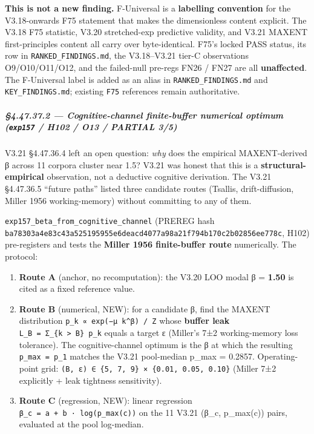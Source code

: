 \documentclass[
]{article}
\providecommand{\tightlist}{%
  \setlength{\itemsep}{0pt}\setlength{\parskip}{0pt}}
\begin{document}
\textbf{This is not a new finding.} F-Universal is a \textbf{labelling
convention} for the V3.18-onwards F75 statement that makes the
dimensionless content explicit. The V3.18 F75 statistic, V3.20
stretched-exp predictive validity, and V3.21 MAXENT first-principles
content all carry over byte-identical. F75's locked PASS status, its row
in \texttt{RANKED\_FINDINGS.md}, the V3.18--V3.21 tier-C observations
O9/O10/O11/O12, and the failed-null pre-regs FN26 / FN27 are all
\textbf{unaffected}. The F-Universal label is added as an alias in
\texttt{RANKED\_FINDINGS.md} and \texttt{KEY\_FINDINGS.md}; existing
\texttt{F75} references remain authoritative.

\subparagraph{\texorpdfstring{§4.47.37.2 --- Cognitive-channel
finite-buffer numerical optimum (\texttt{exp157} / H102 / O13 / PARTIAL
3/5)}{§4.47.37.2 --- Cognitive-channel finite-buffer numerical optimum (exp157 / H102 / O13 / PARTIAL 3/5)}}\label{cognitive-channel-finite-buffer-numerical-optimum-exp157-h102-o13-partial-35}

V3.21 §4.47.36.4 left an open question: \emph{why} does the empirical
MAXENT-derived β across 11 corpora cluster near 1.5? V3.21 was honest
that this is a \textbf{structural-empirical} observation, not a
deductive cognitive derivation. The V3.21 §4.47.36.5 ``future paths''
listed three candidate routes (Tsallis, drift-diffusion, Miller 1956
working-memory) without committing to any of them.

\texttt{exp157\_beta\_from\_cognitive\_channel} (PREREG hash
\texttt{ba78303a4e83c43a525195955e6deacd4077a98a21f794b170c2b02856ee778c},
H102) pre-registers and tests the \textbf{Miller 1956 finite-buffer
route} numerically. The protocol:

\begin{enumerate}
\def\labelenumi{\arabic{enumi}.}
\tightlist
\item
  \textbf{Route A} (anchor, no recomputation): the V3.20 LOO modal β =
  \textbf{1.50} is cited as a fixed reference value.
\item
  \textbf{Route B} (numerical, NEW): for a candidate β, find the MAXENT
  distribution \texttt{p\_k\ ∝\ exp(−μ\ k\^{}β)\ /\ Z} whose
  \textbf{buffer leak}
  \texttt{L\_B\ =\ Σ\_\{k\ \textgreater{}\ B\}\ p\_k} equals a target ε
  (Miller's 7±2 working-memory loss tolerance). The cognitive-channel
  optimum is the β at which the resulting \texttt{p\_max\ =\ p\_1}
  matches the V3.21 pool-median p\_max = 0.2857. Operating-point grid:
  \texttt{(B,\ ε)\ ∈\ \{5,\ 7,\ 9\}\ ×\ \{0.01,\ 0.05,\ 0.10\}} (Miller
  7±2 explicitly + leak tightness sensitivity).
\item
  \textbf{Route C} (regression, NEW): linear regression
  \texttt{β\_c\ =\ a\ +\ b\ ·\ log(p\_max(c))} on the 11 V3.21 (β\_c,
  p\_max(c)) pairs, evaluated at the pool log-median.
\end{enumerate}
\end{document}
